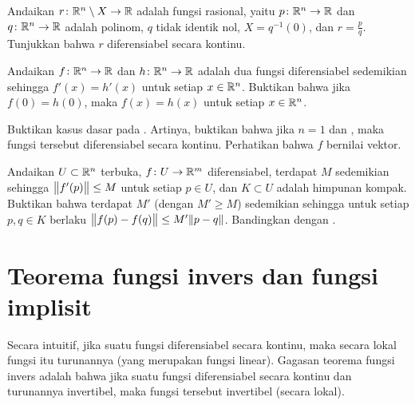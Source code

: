 \begin{exercise}
Andaikan $r \colon {\mathbb{R}}^n \setminus X \to {\mathbb{R}}$ adalah fungsi rasional, yaitu
$p \colon {\mathbb{R}}^n \to {\mathbb{R}}$ dan
$q \colon {\mathbb{R}}^n \to {\mathbb{R}}$ adalah polinom,
$q$ tidak identik nol,
$X = q^{-1}(0)$, dan
$r = \frac{p}{q}$.
Tunjukkan bahwa $r$ diferensiabel secara kontinu.
\end{exercise}

\begin{exercise}
Andaikan $f \colon {\mathbb{R}}^n \to {\mathbb{R}}$ dan $h \colon {\mathbb{R}}^n \to {\mathbb{R}}$ adalah dua 
fungsi diferensiabel sedemikian sehingga $f'(x) = h'(x)$ untuk setiap $x \in {\mathbb{R}}^n$.
Buktikan bahwa
jika $f(0) = h(0)$, maka $f(x) = h(x)$ untuk setiap $x \in {\mathbb{R}}^n$.
\end{exercise}

\begin{exercise}
Buktikan kasus dasar
pada .  Artinya, buktikan bahwa
jika $n=1$ dan 
, maka fungsi tersebut
diferensiabel secara kontinu.  Perhatikan bahwa $f$ bernilai vektor.
\end{exercise}

\begin{exercise}
Andaikan $U \subset {\mathbb{R}}^n$ terbuka, $f \colon U \to {\mathbb{R}}^m$
diferensiabel, terdapat $M$ sedemikian sehingga $\bigl\lVert {f'(p)} \bigr\rVert \leq M$
untuk setiap $p \in U$, dan $K \subset U$ adalah himpunan kompak.  Buktikan bahwa
terdapat $M'$ (dengan $M' \geq M$) sedemikian sehingga
untuk setiap $p,q \in K$ berlaku $\bigl\lVert {f(p)-f(q)} \bigr\rVert \leq M' \lVert {p-q} \rVert$.
Bandingkan dengan .
\end{exercise}



\sectionnewpage
\section{Teorema fungsi invers dan fungsi implisit}
\label{sec:svinvfuncthm}



Secara intuitif, jika suatu fungsi diferensiabel secara kontinu, maka secara lokal fungsi itu
 turunannya (yang merupakan fungsi linear).
Gagasan teorema fungsi invers adalah bahwa jika suatu fungsi
diferensiabel secara kontinu dan turunannya invertibel, maka fungsi tersebut
invertibel (secara lokal).


